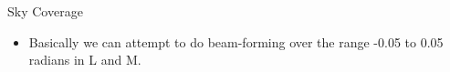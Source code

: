 \documentclass[pdf,azure,slideColor,colorBG]{prosper}
\begin{document}
\begin{slide}{Sky Coverage}
\begin{small}
\begin{itemize}
\item Basically we can attempt to do beam-forming over the range -0.05 to 0.05 radians in L and M.
\end{itemize}
\end {small}
{\centering
{}
\par}
\end{slide}                             
\end{document}
